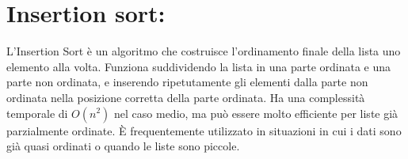 \documentclass{article}
\begin{document}
\section{Insertion sort:}
L'Insertion Sort è un algoritmo che costruisce l'ordinamento finale della lista uno elemento alla volta. Funziona suddividendo la lista in una parte 
ordinata e una parte non ordinata, e inserendo ripetutamente gli elementi dalla parte non ordinata nella posizione corretta della parte ordinata. Ha una 
complessità temporale di \(O(n^2)\) nel caso medio, ma può essere molto efficiente per liste già parzialmente ordinate. È frequentemente utilizzato in situazioni 
in cui i dati sono già quasi ordinati o quando le liste sono piccole.
\end{document}
